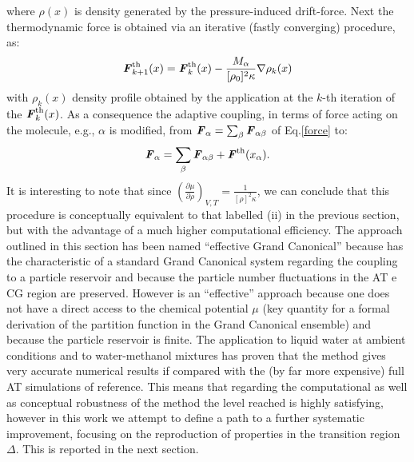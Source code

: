 \documentclass[aps,pre,preprint]{revtex4}
\renewcommand{\v}[1]{\textbf{\textit{#1}}}
\begin{document}
where $\rho(x)$ is density generated by the pressure-induced drift-force. Next the thermodynamic force is obtained via an iterative (fastly converging) procedure, as:
\begin{equation}
{\v F}_{k+1}^{\textrm{th}}(x)={\v F}_{k}^{\textrm{th}}(x)-\frac{M_{\alpha}}{[\rho_{0}]^{2}\kappa}\nabla\rho_{k}(x)
\label{iter}
\end{equation}
with $\rho_k(x)$ density profile obtained by the application at the $k$-th iteration of the ${\v F}_k^{\textrm{th}}(x)$.
As a consequence the adaptive coupling, in terms of force acting on the molecule, e.g., $\alpha$ is modified, from ${\v F}_{\alpha}=\sum_{\beta}{\v F}_{\alpha\beta}$ of Eq.\ref{force} to:
\begin{equation}
{\v F}_{\alpha}=\sum_{\beta}{\v F}_{\alpha\beta}+{\v F}^{\textrm{th}}(x_{\alpha}).
\label{mody}
\end{equation}
 It is interesting to note that since $\left({\frac{\partial\mu}{\partial\rho}}\right)_{V,T}=\frac{1}{[\rho]^{2}\kappa}$, we can conclude that this procedure is conceptually equivalent to that labelled (ii) in the previous section, but with the advantage of a much higher computational efficiency.
The approach outlined in this section has been named ``effective Grand Canonical'' because has the characteristic of a standard Grand Canonical system regarding the coupling to a particle reservoir and because the particle number fluctuations in the AT e CG region are preserved. However is an ``effective'' approach because one does not have a direct access to the chemical potential $\mu$ (key quantity for a formal derivation of the partition function in the Grand Canonical ensemble) and because the particle reservoir is finite. The application to liquid water at ambient conditions \cite{prlgc} and to water-methanol mixtures \cite{debash} has proven that the method gives very accurate numerical results if compared with the (by far more expensive) full AT simulations of reference. This means that regarding the computational as well as conceptual robustness of the method the level reached is highly satisfying, however in this work we attempt to define a path to a further systematic improvement, focusing on the reproduction of properties in the transition region $\Delta$.
This is reported in the next section.
\end{document}
